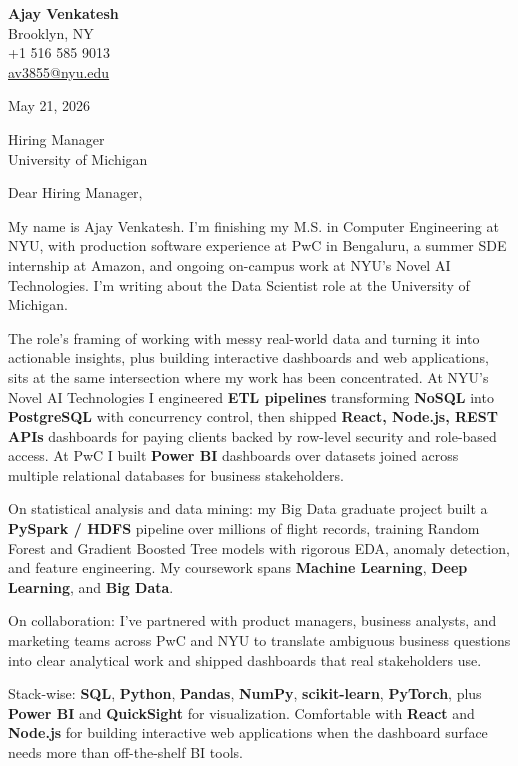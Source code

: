 \documentclass[letterpaper,11pt]{article}
\begin{document}
\begin{flushleft}
\textbf{\large Ajay Venkatesh} \\
Brooklyn, NY \\
+1 516 585 9013 \\
\href{mailto:av3855@nyu.edu}{av3855@nyu.edu}
\end{flushleft}
\vspace{10pt}
May 21, 2026
\vspace{6pt}

Hiring Manager \\
University of Michigan

\vspace{10pt}

Dear Hiring Manager,

My name is Ajay Venkatesh. I'm finishing my M.S. in Computer Engineering at NYU, with production software experience at PwC in Bengaluru, a summer SDE internship at Amazon, and ongoing on-campus work at NYU's Novel AI Technologies. I'm writing about the Data Scientist role at the University of Michigan.

The role's framing of working with messy real-world data and turning it into actionable insights, plus building interactive dashboards and web applications, sits at the same intersection where my work has been concentrated. At NYU's Novel AI Technologies I engineered \textbf{ETL pipelines} transforming \textbf{NoSQL} into \textbf{PostgreSQL} with concurrency control, then shipped \textbf{React, Node.js, REST APIs} dashboards for paying clients backed by row-level security and role-based access. At PwC I built \textbf{Power BI} dashboards over datasets joined across multiple relational databases for business stakeholders.

On statistical analysis and data mining: my Big Data graduate project built a \textbf{PySpark / HDFS} pipeline over millions of flight records, training Random Forest and Gradient Boosted Tree models with rigorous EDA, anomaly detection, and feature engineering. My coursework spans \textbf{Machine Learning}, \textbf{Deep Learning}, and \textbf{Big Data}.

On collaboration: I've partnered with product managers, business analysts, and marketing teams across PwC and NYU to translate ambiguous business questions into clear analytical work and shipped dashboards that real stakeholders use.

Stack-wise: \textbf{SQL}, \textbf{Python}, \textbf{Pandas}, \textbf{NumPy}, \textbf{scikit-learn}, \textbf{PyTorch}, plus \textbf{Power BI} and \textbf{QuickSight} for visualization. Comfortable with \textbf{React} and \textbf{Node.js} for building interactive web applications when the dashboard surface needs more than off-the-shelf BI tools.
\end{document}
